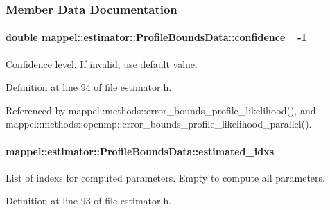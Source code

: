 \subsubsection{Member Data Documentation}
\paragraph[{\texorpdfstring{confidence}{confidence}}]{\setlength{\rightskip}{0pt plus 5cm}double mappel\+::estimator\+::\+Profile\+Bounds\+Data\+::confidence =-\/1}\hypertarget{structmappel_1_1estimator_1_1ProfileBoundsData_a7c56b494bd5c2af6fcf6f8b40416a203}{}\label{structmappel_1_1estimator_1_1ProfileBoundsData_a7c56b494bd5c2af6fcf6f8b40416a203}


Confidence level. If invalid, use default value. 



Definition at line 94 of file estimator.\+h.



Referenced by mappel\+::methods\+::error\+\_\+bounds\+\_\+profile\+\_\+likelihood(), and mappel\+::methods\+::openmp\+::error\+\_\+bounds\+\_\+profile\+\_\+likelihood\+\_\+parallel().

\paragraph[{\texorpdfstring{estimated\+\_\+idxs}{estimated_idxs}}]{ mappel\+::estimator\+::\+Profile\+Bounds\+Data\+::estimated\+\_\+idxs}\hypertarget{structmappel_1_1estimator_1_1ProfileBoundsData_a04704405afc4353671f67cee0f221f6b}{}\label{structmappel_1_1estimator_1_1ProfileBoundsData_a04704405afc4353671f67cee0f221f6b}


List of indexs for computed parameters. Empty to compute all parameters. 



Definition at line 93 of file estimator.\+h.



